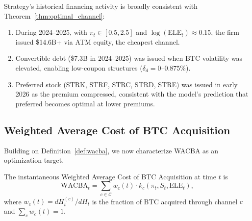 \begin{corollary}\label{cor:observed}
Strategy's historical financing activity is broadly consistent with
Theorem~\ref{thm:optimal_channel}:
\begin{enumerate}
  \item During 2024--2025, with $\pi_t \in [0.5, 2.5]$ and
    $\log(\mathrm{ELE}_t) \approx 0.15$, the firm issued
    \$14.6B+ via ATM equity, the cheapest channel.
  \item Convertible debt (\$7.3B in 2024--2025) was issued when BTC
    volatility was elevated, enabling low-coupon structures
    ($\delta_d = 0\text{--}0.875\%$).
  \item Preferred stock (STRK, STRF, STRC, STRD, STRE) was issued in
    early 2026 as the premium compressed, consistent with the model's
    prediction that preferred becomes optimal at lower premiums.
\end{enumerate}
\end{corollary}

\subsection{Weighted Average Cost of BTC Acquisition}\label{subsec:wacba_opt}

Building on Definition~\ref{def:wacba}, we now characterize WACBA as an
optimization target.

\begin{definition}\label{def:wacba_inst}
The instantaneous Weighted Average Cost of BTC Acquisition at time $t$ is
\begin{equation}\label{eq:wacba_inst}
  \mathrm{WACBA}_t
  = \sum_{c \in \mathcal{C}} w_c(t) \cdot k_c(\pi_t, S_t, \mathrm{ELE}_t),
\end{equation}
where $w_c(t) = dH_t^{(c)} / dH_t$ is the fraction of BTC acquired through
channel $c$ and $\sum_c w_c(t) = 1$.
\end{definition}

